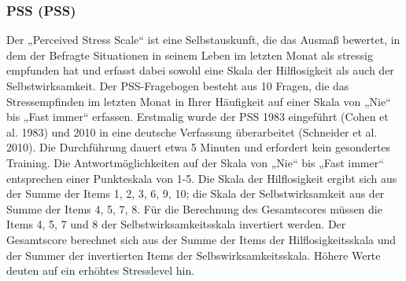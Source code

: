\subsubsection{\acl{PSS} (\acs{PSS})}
Der „Perceived Stress Scale“ ist eine Selbstauskunft, die das Ausmaß bewertet, in dem der Befragte Situationen in seinem Leben im letzten Monat als stressig empfunden hat und erfasst dabei sowohl eine Skala der Hilflosigkeit als auch der Selbstwirksamkeit. Der PSS-Fragebogen besteht aus 10 Fragen, die das Stressempfinden im letzten Monat in Ihrer Häufigkeit auf einer Skala von „Nie“ bis „Fast immer“ erfassen. Erstmalig wurde der PSS 1983 eingeführt (Cohen et al. 1983) und 2010 in eine deutsche Verfassung überarbeitet (Schneider et al. 2010). 
Die Durchführung dauert etwa 5 Minuten und erfordert kein gesondertes Training. Die Antwortmöglichkeiten auf der Skala von „Nie“ bis „Fast immer“ entsprechen einer Punkteskala von 1-5. Die Skala der Hilflosigkeit ergibt sich aus der Summe der Items 1, 2, 3, 6, 9, 10; die Skala der Selbstwirksamkeit aus der Summe der Items 4, 5, 7, 8. Für die Berechnung des Gesamtscores müssen die Items 4, 5, 7 und 8 der Selbstwirksamkeitsskala invertiert werden. Der Gesamtscore berechnet sich aus der Summe der Items der Hilflosigkeitsskala und der Summer der invertierten Items der Selbswirksamkeitsskala. Höhere Werte deuten auf ein erhöhtes Stresslevel hin.

